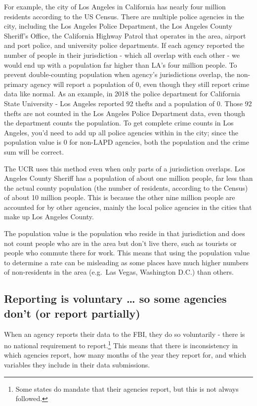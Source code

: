 \documentclass[
  12pt,
  openany]{book}
\begin{document}
For example, the city of Los Angeles in California has nearly four million residents according to the US Census. There are multiple police agencies in the city, including the Los Angeles Police Department, the Los Angeles County Sheriff's Office, the California Highway Patrol that operates in the area, airport and port police, and university police departments. If each agency reported the number of people in their jurisdiction - which all overlap with each other - we would end up with a population far higher than LA's four million people. To prevent double-counting population when agency's jurisdictions overlap, the non-primary agency will report a population of 0, even though they still report crime data like normal. As an example, in 2018 the police department for California State University - Los Angeles reported 92 thefts and a population of 0. Those 92 thefts are not counted in the Los Angeles Police Department data, even though the department counts the population. To get complete crime counts in Los Angeles, you'd need to add up all police agencies within in the city; since the population value is 0 for non-LAPD agencies, both the population and the crime sum will be correct.

The UCR uses this method even when only parts of a jurisdiction overlaps. Los Angeles County Sheriff has a population of about one million people, far less than the actual county population (the number of residents, according to the Census) of about 10 million people. This is because the other nine million people are accounted for by other agencies, mainly the local police agencies in the cities that make up Los Angeles County.

The population value is the population who reside in that jurisdiction and does not count people who are in the area but don't live there, such as tourists or people who commute there for work. This means that using the population value to determine a rate can be misleading as some places have much higher numbers of non-residents in the area (e.g.~Las Vegas, Washington D.C.) than others.

\hypertarget{voluntary}{%
\subsection{Reporting is voluntary \ldots{} so some agencies don't (or report partially)}\label{voluntary}}

When an agency reports their data to the FBI, they do so voluntarily - there is no national requirement to report.\footnote{Some states do mandate that their agencies report, but this is not always followed.} This means that there is inconsistency in which agencies report, how many months of the year they report for, and which variables they include in their data submissions.
\end{document}
